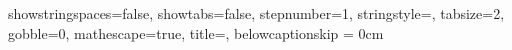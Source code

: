{    showstringspaces=false,          			%
    showtabs=false,                  			%
    stepnumber=1,                    			%
    stringstyle=\color{white},            		%
    tabsize=2,                       			%
    gobble=0,									%
    mathescape=true,								%
    title=\lstname,                   			%
    belowcaptionskip = 0cm
 }